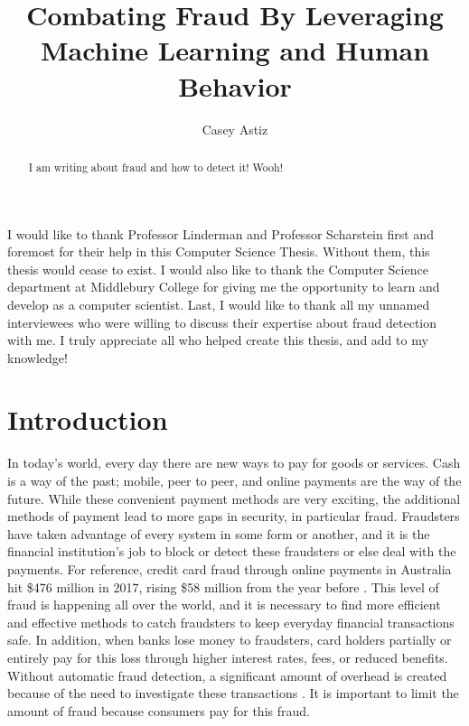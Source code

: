 \documentclass[midd]{thesis}
\title {Combating Fraud By Leveraging Machine Learning and Human Behavior}
\author {Casey Astiz}
\begin{document}
\maketitle
{}

\begin{abstract}
I am writing about fraud and how to detect it! Wooh!
\end{abstract}

\begin{acknowledgements}
I would like to thank Professor Linderman and Professor Scharstein first and foremost for their help in this Computer Science Thesis. Without them, this thesis would cease to exist. I would also like to thank the Computer Science department at Middlebury College for giving me the opportunity to learn and develop as a computer scientist. Last, I would like to thank all my unnamed interviewees who were willing to discuss their expertise about fraud detection with me. I truly appreciate all who helped create this thesis, and add to my knowledge!

\end{acknowledgements}

\contentspage
\tablelistpage   %
\figurelistpage

\normalspacing \setcounter{page}{1} 

\chapter{Introduction}
\label{sec:intro}


In today's world, every day there are new ways to pay for goods or services. Cash is a way of the past; mobile, peer to peer, and online payments are the way of the future. While these convenient payment methods are very exciting, the additional methods of payment lead to more gaps in security, in particular fraud. Fraudsters have taken advantage of every system in some form or another, and it is the financial institution's job to block or detect these fraudsters or else deal with the payments. For reference, credit card fraud through online payments in Australia hit \$476 million in 2017, rising \$58 million from the year before \cite{Wang2018}. This level of fraud is happening all over the world, and it is necessary to find more efficient and effective methods to catch fraudsters to keep everyday financial transactions safe. In addition, when banks lose money to fraudsters, card holders partially or entirely pay for this loss through higher interest rates, fees, or reduced benefits. Without automatic fraud detection, a significant amount of overhead is created because of the need to investigate these transactions \cite{Chan}. It is important to limit the amount of fraud because consumers pay for this fraud. 
\end{document}
